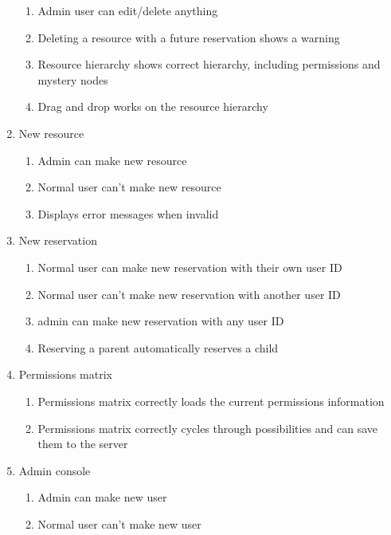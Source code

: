 \documentclass[12pt]{article}
\begin{document}
\begin{enumerate}
\begin{enumerate}
        \item Admin user can edit/delete anything
        \item Deleting a resource with a future reservation shows a warning
        \item Resource hierarchy shows correct hierarchy, including permissions and mystery nodes
        \item Drag and drop works on the resource hierarchy
    \end{enumerate}
    \item New resource
    \begin{enumerate}
        \item Admin can make new resource
        \item Normal user can't make new resource
        \item Displays error messages when invalid
    \end{enumerate}
    \item New reservation
    \begin{enumerate}
        \item Normal user can make new reservation with their own user ID
        \item Normal user can't make new reservation with another user ID
        \item admin can make new reservation with any user ID
        \item Reserving a parent automatically reserves a child
    \end{enumerate}
    \item Permissions matrix
    \begin{enumerate}
        \item Permissions matrix correctly loads the current permissions information
        \item Permissions matrix correctly cycles through possibilities and can save them to the server
    \end{enumerate}
    \item Admin console
    \begin{enumerate}
        \item Admin can make new user
        \item Normal user can't make new user
    \end{enumerate}
\end{enumerate}

\clearpage
\end{document}
